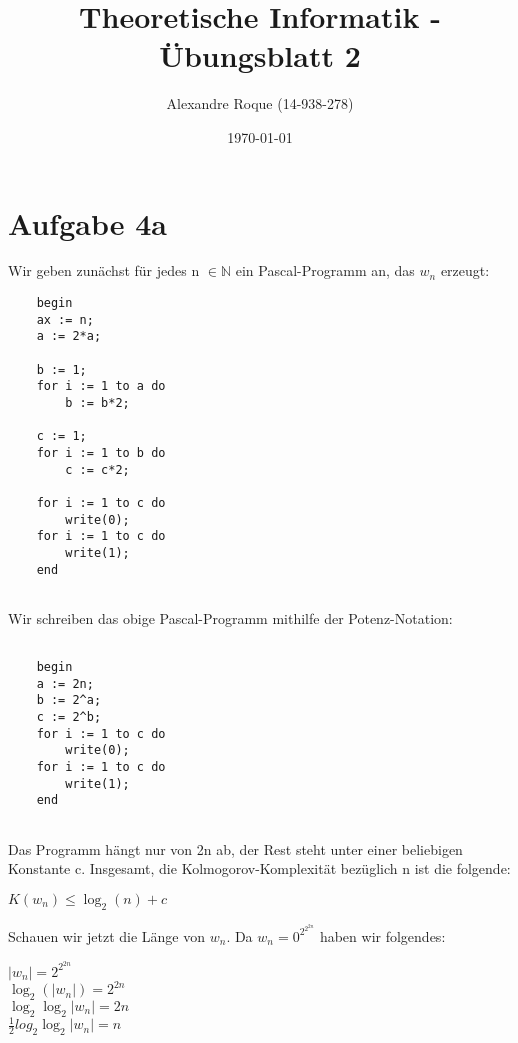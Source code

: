 \documentclass{article}
\title{Theoretische Informatik - Übungsblatt 2}
\author{Alexandre Roque (14-938-278)}
\date{\today}
\begin{document}
    \maketitle
    
    \section*{Aufgabe 4a}
    
    Wir geben zunächst für jedes n $\in \mathbb{N}$  ein Pascal-Programm an, das $w_{n}$ erzeugt:
    
    \lstset{language=Pascal}
    \begin{lstlisting}
    begin
    ax := n;
    a := 2*a;
    
    b := 1;
    for i := 1 to a do
    	b := b*2;
    	
    c := 1;
    for i := 1 to b do 
    	c := c*2;
    	
    for i := 1 to c do
    	write(0);
    for i := 1 to c do
    	write(1);	 		
    end
    	
    \end{lstlisting}
    
    \par
    \noindent
    Wir schreiben das obige Pascal-Programm mithilfe der Potenz-Notation:     \lstset{language=Pascal}
    \begin{lstlisting}
    	
	begin
	a := 2n;
	b := 2^a;
	c := 2^b;
	for i := 1 to c do 
		write(0);
	for i := 1 to c do
		write(1);
	end  	
    	
    \end{lstlisting}
    
    \par
    
    Das Programm hängt nur von 2n ab, der Rest steht unter einer beliebigen Konstante c.
    Insgesamt, die Kolmogorov-Komplexität bezüglich n ist die folgende:
    
    \par
    
    \begin{center}
    	$K(w_{n}) \le \log_{2}(n)+ c$
    \end{center}
    
    \par
    
    Schauen wir jetzt die Länge von $w_{n}$. Da $w_{n} = 0^{2^{2^{2n}}}$ haben wir folgendes: 
    
    \begin{center}
    $|w_{n}| = 2^{2^{2n}}$ \\
    $\log_{2}(|w_{n}|) = 2^{2n}$ \\
    $\log_{2} \log_{2} |w_{n}|= 2n$ \\
    $\frac{1}{2} log_{2} \log_{2} |w_{n}|= n$
    \end{center}
    
\end{document}
